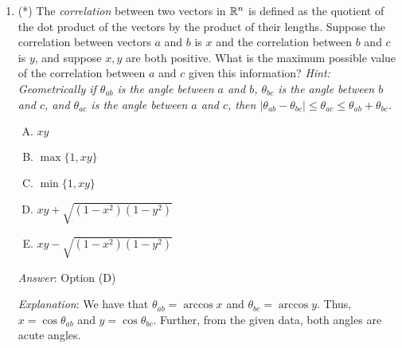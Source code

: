 \documentclass[10pt]{amsart}
\begin{document}
\begin{enumerate}
  {\em Answer}: Option (E)

  {\em Explanation}: Since $a \times b$ and $c \times d$ are both
  nonzero, but their cross product is zero, we conclude that they are
  both scalar multiples of each other. In particular, they are in the
  same line. Further, we also obtain that $a$, $b$, $c$, and $d$ are
  individually nonzero.

  We know that $a$ and $b$ both lie in the plane orthogonal to $a
  \times b$. Similarly, $c$ and $d$ both lie in the plane orthogonal
  to $c \times d$. Because $a \times b$ and $c \times d$ are in the
  same line, we obtain that, in fact, the plane of $a$ and $b$ is the
  same as the plane of $c$ and $d$.

  {\em Performance review}: $21$ out of $24$ people got this. $2$
  chose (D), $1$ chose (A).

  {\em Historical note (last year)}: $9$ out of $23$ people got this
  correct. $6$ chose (D), $4$ chose (C), $3$ chose (B), $1$ chose (A).
\item (*) The {\em correlation} between two vectors in $\mathbb{R}^n$ is
  defined as the quotient of the dot product of the vectors by the
  product of their lengths. Suppose the correlation between vectors
  $a$ and $b$ is $x$ and the correlation between $b$ and $c$ is $y$,
  and suppose $x,y$ are both positive. What is the maximum possible
  value of the correlation between $a$ and $c$ given this information?
  {\em Hint: Geometrically if $\theta_{ab}$ is the angle between $a$
  and $b$, $\theta_{bc}$ is the angle between $b$ and $c$, and
  $\theta_{ac}$ is the angle between $a$ and $c$, then $|\theta_{ab} -
  \theta_{bc}| \le \theta_{ac} \le \theta_{ab} + \theta_{bc}$.}

  \begin{enumerate}[(A)]
  \item $xy$
  \item $\max \{ 1, xy \}$
  \item $\min \{ 1, xy \}$
  \item $xy + \sqrt{(1 - x^2)(1 - y^2)}$
  \item $xy - \sqrt{(1 - x^2)(1 - y^2)}$
  \end{enumerate}

  {\em Answer}: Option (D)

  {\em Explanation}: We have that $\theta_{ab} = \arccos x$ and
  $\theta_{bc} = \arccos y$. Thus, $x = \cos \theta_{ab}$ and $y =
  \cos \theta_{bc}$. Further, from the given data, both angles are
  acute angles.


\end{enumerate}
\end{document}

